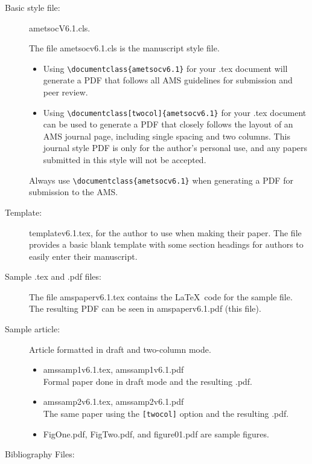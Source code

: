 \documentclass{ametsocV6.1}
\begin{document}
\begin{description}
\item[Basic style file:] ametsocV6.1.cls.

The file ametsocv6.1.cls is the manuscript style file.

\begin{itemize}
\item
Using \verb+\documentclass{ametsocv6.1}+ for your .tex document
will
generate a PDF that follows all AMS guidelines for submission and peer
review.

\item
Using \verb+\documentclass[twocol]{ametsocv6.1}+ for your .tex document
can be used to generate a PDF that closely
follows the layout of an AMS journal page, including single spacing and two
columns.  This journal style PDF is only for the author's personal use, and
any papers submitted in this style will not be accepted.
\end{itemize}
Always use \verb+\documentclass{ametsocv6.1}+
when generating a PDF for submission to the AMS.

\item[Template:]
templatev6.1.tex, for the author to use when making their
paper.
The file provides a basic blank template with some
section headings for authors to easily enter their manuscript.

\item[Sample .tex and .pdf files:]
The file amspaperv6.1.tex contains the \LaTeX\ code for the sample file.
The resulting PDF can be seen in amspaperv6.1.pdf (this file).


\item[Sample article:] Article formatted in draft and two-column mode.

\begin{itemize}
\item
amssamp1v6.1.tex, amssamp1v6.1.pdf\\
Formal paper done in draft mode and the resulting .pdf.

\item
amssamp2v6.1.tex, amssamp2v6.1.pdf \\
The same paper using the \verb+[twocol]+ option and the resulting .pdf.

\item
FigOne.pdf, FigTwo.pdf, and figure01.pdf are sample figures.


\end{itemize}

\item[Bibliography Files:]


\end{description}
\end{document}
